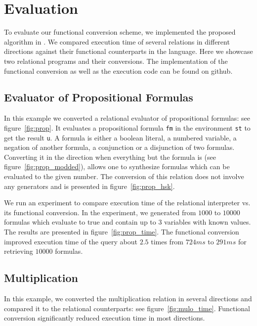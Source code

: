 \section{Evaluation}

To evaluate our functional conversion scheme, we implemented the proposed algorithm in \haskell {}.
We compared execution time of several relations in different directions against their functional counterparts in the \ocaml language.
Here we showcase two relational programs and their conversions.
The implementation of the functional conversion  as well as the execution code  can be found on github.



\subsection{Evaluator of Propositional Formulas}

In this example we converted a relational evaluator of propositional formulas: see figure~\ref{fig:prop}.
It evaluates a propositional formula \lstinline{fm} in the environment \lstinline{st} to get the result \lstinline{u}.
A formula is either a boolean literal, a numbered variable, a negation of another formula, a conjunction or a disjunction of two formulas.
Converting it in the direction when everything but the formula is \inm (see figure~\ref{fig:prop_modded}), allows one to synthesize formulas which can be evaluated to the given number.
The conversion of this relation does not involve any generators and is presented in figure~\ref{fig:prop_hsk}.

We run an experiment to compare execution time of the relational interpreter vs. its functional conversion.
In the experiment, we generated from $1000$ to $10000$ formulas which evaluate to true and contain up to $3$ variables with known values.
The results are presented in figure~\ref{fig:prop_time}.
The functional conversion improved execution time of the query about $2.5$ times from $724ms$ to $291ms$ for retrieving $10000$ formulas.



\subsection{Multiplication}

In this example, we converted the multiplication relation in several directions and compared it to the relational counterparts: see figure~\ref{fig:mulo_time}.
Functional conversion significantly reduced execution time in most directions.

